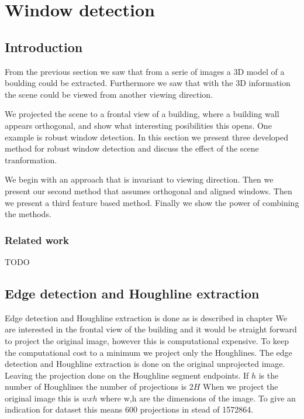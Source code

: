 \section{Window detection}
\label{chap:windowDetection}
\subsection{Introduction}
From the previous section we saw that from a serie of images a 3D model of a
boulding could be extracted. Furthermore we saw that with the 3D information the
scene could be viewed from another viewing direction. 

We projected the scene to a frontal view of a building, where a building wall appears
orthogonal, and show what interesting posibilities this opens.
One example is robust window detection.
In this section we present three developed method for robust window detection
and discuss the effect of the scene tranformation.

We begin with an approach that is invariant to viewing direction.  Then we
present our second method that assumes orthogonal and aligned windows.  Then we
present a third feature based method.  Finally we show the power of combining
the methods.



\subsubsection{Related work}
TODO

\subsection{Edge detection and Houghline extraction} 
Edge detection and Houghline extraction is done as is described in chapter
We are interested in the frontal view of the building and it would be straight
forward to project the original image, however this is computational
expensive. To keep the computational cost to a minimum we project only the
Houghlines. The edge detection and Houghline extraction is done on the original
unprojected image. Leaving the projection done on the Houghline segment
endpoints. If $h$ is the number of Houghlines the number of projections is $2H$
When we project the original image this is $wxh$ where w,h are the dimensions of
the image. To give an indication for dataset %
this means 600 projections in stead of 1572864.

